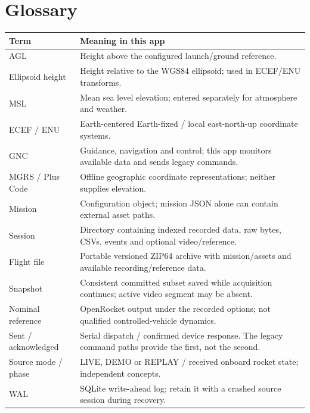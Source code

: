 \section{Glossary}
\begin{longtable}{@{}L{.23\linewidth}L{.70\linewidth}@{}}
\toprule Term & Meaning in this app \\\midrule\endhead
AGL & Height above the configured launch/ground reference. \\
Ellipsoid height & Height relative to the WGS84 ellipsoid; used in ECEF/ENU transforms. \\
MSL & Mean sea level elevation; entered separately for atmosphere and weather. \\
ECEF / ENU & Earth-centered Earth-fixed / local east-north-up coordinate systems. \\
GNC & Guidance, navigation and control; this app monitors available data and sends legacy commands. \\
MGRS / Plus Code & Offline geographic coordinate representations; neither supplies elevation. \\
Mission & Configuration object; mission JSON alone can contain external asset paths. \\
Session & Directory containing indexed recorded data, raw bytes, CSVs, events and optional video/reference. \\
Flight file & Portable versioned ZIP64 archive with mission/assets and available recording/reference data. \\
Snapshot & Consistent committed subset saved while acquisition continues; active video segment may be absent. \\
Nominal reference & OpenRocket output under the recorded options; not qualified controlled-vehicle dynamics. \\
Sent / acknowledged & Serial dispatch / confirmed device response. The legacy command paths provide the first, not the second. \\
Source mode / phase & LIVE, DEMO or REPLAY / received onboard rocket state; independent concepts. \\
WAL & SQLite write-ahead log; retain it with a crashed source session during recovery. \\
\bottomrule
\end{longtable}
